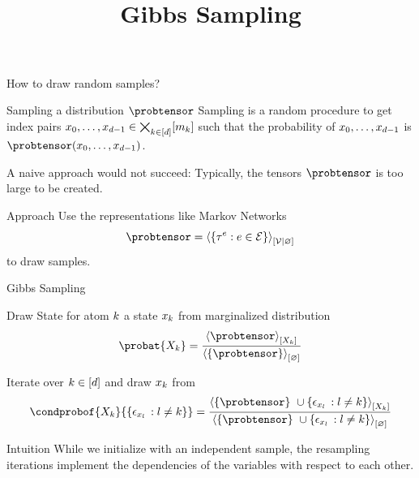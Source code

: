 \documentclass{beamer}
\title[Gibbs Sampling]{
	\coursechaptertwo \\
	{\huge Gibbs Sampling}
}
\begin{document}
{\frame[plain]{\titlepage}}



\begin{frame}{How to draw random samples?}

\begin{block}{Sampling a distribution $\probtensor$}
	Sampling is a random procedure to get index pairs $x_{0},\ldots,x_{d-1}\in\bigtimes_{k\in[d]}[m_{k}]$ such that the probability of $x_{0},\ldots,x_{d-1}$ is $\probtensor(\catindices)$.
\end{block}

{A naive approach would not succeed:} Typically, the tensors $\probtensor$ is too large to be created.

\medskip

\begin{block}{Approach}
	Use the representations like Markov Networks
		\[ \probtensor = \normalizationofwrt{\{\hypercoreof{\edge} : \edge \in \edges\}}{\nodes}{\varnothing}  \]
	to draw samples.
\end{block}

\end{frame}






\begin{frame}{Gibbs Sampling}


Draw State for atom $k$ a state $x_{k}$ from marginalized distribution 
	\[ \probat{\catvariableof{\atomenumerator}} = \frac{\contractionof{\probtensor}{\catvariableof{\atomenumerator}}
		}{
		\contractionof{\{\probtensor\}}{\varnothing}
		} \]

\medskip

Iterate over $k\in[d]$ and draw $x_{k}$ from 
		\[ \condprobof{\catvariableof{\atomenumerator}}{\{\onehotmapof{\atomlegindexof{\secatomenumerator}} \, : \secatomenumerator \neq \atomenumerator\}} = 
		\frac{
		\contractionof{\{\probtensor\} \cup \{\onehotmapof{\atomlegindexof{\secatomenumerator}} \, : \secatomenumerator \neq \atomenumerator \}}{\catvariableof{\atomenumerator}}
		}{
		\contractionof{\{\probtensor\} \cup \{\onehotmapof{\atomlegindexof{\secatomenumerator}} \, : \secatomenumerator \neq \atomenumerator \}}{\varnothing}
		} \]

\begin{block}{Intuition}
	While we initialize with an independent sample, the resampling iterations implement the dependencies of the variables with respect to each other.
\end{block}

\end{frame}
\end{document}
